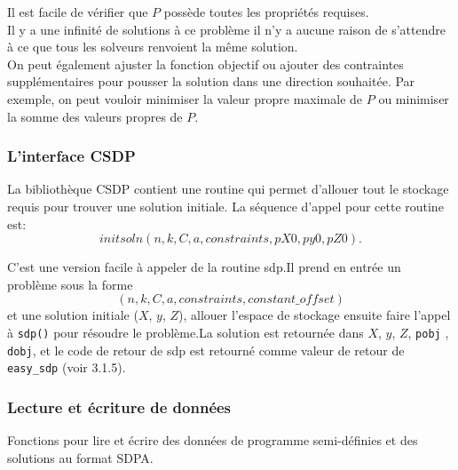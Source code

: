 Il est facile de vérifier que $P$ possède toutes les propriétés requises.\\
Il y a une infinité de solutions à ce problème il n’y a aucune raison de s’attendre à ce que tous les solveurs renvoient la même solution.\\
On peut également ajuster la fonction objectif ou ajouter des contraintes supplémentaires pour pousser la solution dans une direction souhaitée. Par exemple, on peut vouloir minimiser la valeur propre maximale de $P$ ou minimiser la somme des valeurs propres de $P$.
% 
% 

 \subsubsection{L'interface CSDP}
 
 
 
 









\begin{itemize}
	
	La bibliothèque CSDP contient une routine qui permet d’allouer tout le stockage requis pour trouver une solution initiale. La séquence d’appel pour cette routine est:
                         $$ initsoln(n,k,C,a,constraints,pX0,py0,pZ0).$$
	
	 C’est une version facile à appeler de la routine sdp.Il prend en entrée un problème sous la forme $$(n, k, C, a, constraints, constant\_offset)$$ et une solution initiale ($X$, $y$, $Z$), allouer l’espace de stockage ensuite faire l’appel à {\tt sdp()} pour résoudre le problème.La solution est retournée dans $X$, $y$, $Z$, {\tt pobj} , {\tt dobj}, et le code de retour de sdp est retourné comme valeur de retour de  {\tt easy\_sdp} (voir 3.1.5).
	
\end{itemize}


\subsubsection{Lecture et écriture de données}

Fonctions pour lire et écrire des données de programme semi-définies et des solutions au format SDPA.


